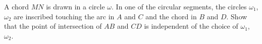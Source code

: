A chord $MN$ is drawn in a circle $\omega$. In one of the circular segments, the circles $\omega_1$, $\omega_2$ are inscribed touching the arc in $A$ and $C$ and the chord in $B$ and $D$. Show that the point of intersection of $AB$ and $CD$ is independent of the choice of $\omega_1$, $\omega_2$.
